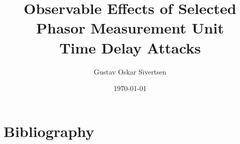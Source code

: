 \documentclass[british,twoside]{ntnuthesis}
\title{Observable Effects of Selected\\ Phasor Measurement Unit\\ Time Delay Attacks}
\author{Gustav Oskar Sivertsen}
\date{\today}
\renewcommand{\includegraphics}[2][ ]{\tcbox[size=small, standard jigsaw, opacityback=0]{\includegraphicsold[#1]{#2}}}
\begin{document}






\listoffigures
\listoftables


\tableofcontents



%
%
%
%
%









%
%
%
%

\chapter*{Bibliography}
\printbibliography[heading=none]

%

%



%
%
%
\end{document}
